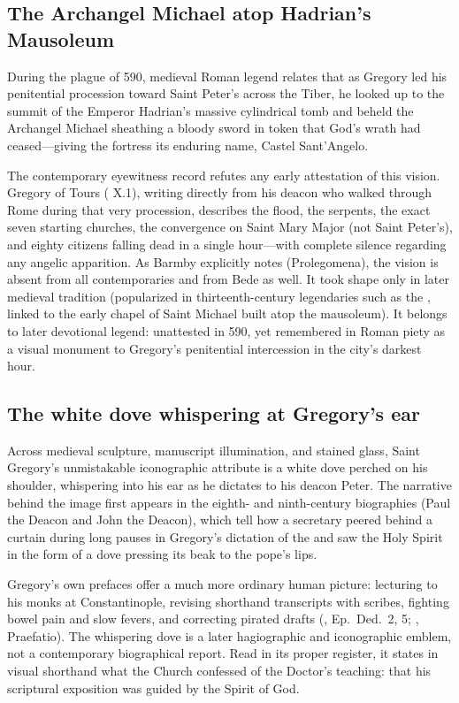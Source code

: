 \subsection{The Archangel Michael atop Hadrian's Mausoleum}

During the plague of 590, medieval Roman legend relates that as Gregory led his
penitential procession toward Saint Peter's across the Tiber, he looked up to
the summit of the Emperor Hadrian's massive cylindrical tomb and beheld the
Archangel Michael sheathing a bloody sword in token that God's wrath had
ceased---giving the fortress its enduring name, Castel Sant'Angelo.

The contemporary eyewitness record refutes any early attestation of this
vision. Gregory of Tours ( X.1), writing directly from
his deacon who walked through Rome during that very procession, describes the
flood, the serpents, the exact seven starting churches, the convergence on
Saint Mary Major (not Saint Peter's), and eighty citizens falling dead in a
single hour---with complete silence regarding any angelic apparition. As Barmby
explicitly notes (Prolegomena), the vision is absent from all contemporaries
and from Bede as well. It took shape only in later medieval tradition
(popularized in thirteenth-century legendaries such as the , linked to the early chapel of Saint Michael built atop the mausoleum).
It belongs to later devotional legend: unattested in 590, yet
remembered in Roman piety as a visual monument to Gregory's penitential
intercession in the city's darkest hour.

\subsection{The white dove whispering at Gregory's ear}

Across medieval sculpture, manuscript illumination, and stained glass, Saint
Gregory's unmistakable iconographic attribute is a white dove perched on his
shoulder, whispering into his ear as he dictates to his deacon Peter. The
narrative behind the image first appears in the eighth- and ninth-century
biographies (Paul the Deacon and John the Deacon), which tell how a secretary
peered behind a curtain during long pauses in Gregory's dictation of the
 and saw the Holy Spirit in the form of a dove
pressing its beak to the pope's lips.

Gregory's own prefaces offer a much more ordinary human picture: lecturing to
his monks at Constantinople, revising shorthand transcripts with scribes,
fighting bowel pain and slow fevers, and correcting pirated drafts
(, Ep.\ Ded.\ 2, 5; , Praefatio).
The whispering dove is a later hagiographic and iconographic emblem,
not a contemporary biographical report. Read in its proper register, it states
in visual shorthand what the Church confessed of the Doctor's teaching: that
his scriptural exposition was guided by the Spirit of God.

